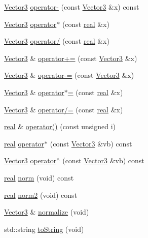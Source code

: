 \begin{DoxyCompactItemize}
\hyperlink{classVector3}{Vector3} \hyperlink{classVector3_a5ee2524456ce751c6da5d6e05adb53f9}{operator-\/} (const \hyperlink{classVector3}{Vector3} \&x) const 
\item 
\hyperlink{classVector3}{Vector3} \hyperlink{classVector3_ae3dce9c6ce9eb2c7cc0cac441b117070}{operator$\ast$} (const \hyperlink{Global_8h_a031f8951175b43076c2084a6c2173410}{real} \&x)
\item 
\hyperlink{classVector3}{Vector3} \hyperlink{classVector3_aaeec54dedd1e7c460beb3437bc3de44b}{operator/} (const \hyperlink{Global_8h_a031f8951175b43076c2084a6c2173410}{real} \&x)
\item 
\hyperlink{classVector3}{Vector3} \& \hyperlink{classVector3_a0c96d7fefbb7bb0b62d51094e53e6b62}{operator+=} (const \hyperlink{classVector3}{Vector3} \&x)
\item 
\hyperlink{classVector3}{Vector3} \& \hyperlink{classVector3_ad083727f119bc00233c6c1adba1d080b}{operator-\/=} (const \hyperlink{classVector3}{Vector3} \&x)
\item 
\hyperlink{classVector3}{Vector3} \& \hyperlink{classVector3_a6050e2dbdfe59ac8738390a37e4b705c}{operator$\ast$=} (const \hyperlink{Global_8h_a031f8951175b43076c2084a6c2173410}{real} \&x)
\item 
\hyperlink{classVector3}{Vector3} \& \hyperlink{classVector3_a08119e6da7d8f016353fb75afff686a1}{operator/=} (const \hyperlink{Global_8h_a031f8951175b43076c2084a6c2173410}{real} \&x)
\item 
\hyperlink{Global_8h_a031f8951175b43076c2084a6c2173410}{real} \& \hyperlink{classVector3_ab82f293f33397e921c38259b1045cf18}{operator()} (const unsigned i)
\item 
\hyperlink{Global_8h_a031f8951175b43076c2084a6c2173410}{real} \hyperlink{classVector3_abd1ce86e44c16023a8e5527b1ab58c4c}{operator$\ast$} (const \hyperlink{classVector3}{Vector3} \&vb) const 
\item 
\hyperlink{classVector3}{Vector3} \hyperlink{classVector3_a1e8229da8ceab6b2c04173ca97dfea34}{operator$^\wedge$} (const \hyperlink{classVector3}{Vector3} \&vb) const 
\item 
\hyperlink{Global_8h_a031f8951175b43076c2084a6c2173410}{real} \hyperlink{classVector3_a8eacbf2e984bf2dc389a9b74136af839}{norm} (void) const 
\item 
\hyperlink{Global_8h_a031f8951175b43076c2084a6c2173410}{real} \hyperlink{classVector3_a37503304451b4709760b16bd03bc6cdf}{norm2} (void) const 
\item 
\hyperlink{classVector3}{Vector3} \& \hyperlink{classVector3_a29306c8a59642a807872a3239b92af65}{normalize} (void)
\item 
std::string \hyperlink{classVector3_a5e8931f972f8768480d28a9e9ed44b5f}{toString} (void)
\end{DoxyCompactItemize}

